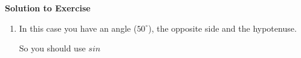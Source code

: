 {\begin{mdframed}[linewidth=4, leftmargin=40, rightmargin=40]
\begin{exercise}
      \vspace{5pt}
      \label{m39408*solfhsst!!!underscore!!!id1143}\noindent\textbf{Solution to Exercise } \label{m39408*listfhsst!!!underscore!!!id1143}\begin{enumerate}[noitemsep, label=\textbf{Step} \textbf{\arabic*}. ] 
            \leftskip=20pt\rightskip=\leftskip\item  
      \label{m39408*id81169}In this case you have an angle (\begin{math}{50}^{\circ }\end{math}), the opposite side and the hypotenuse.\par 
      \label{m39408*id81188}So you should use \begin{math}sin\end{math}\par 
      \label{m39408*id81204}\nopagebreak\noindent{}
    

\end{enumerate}
\end{exercise}
\end{mdframed}}
